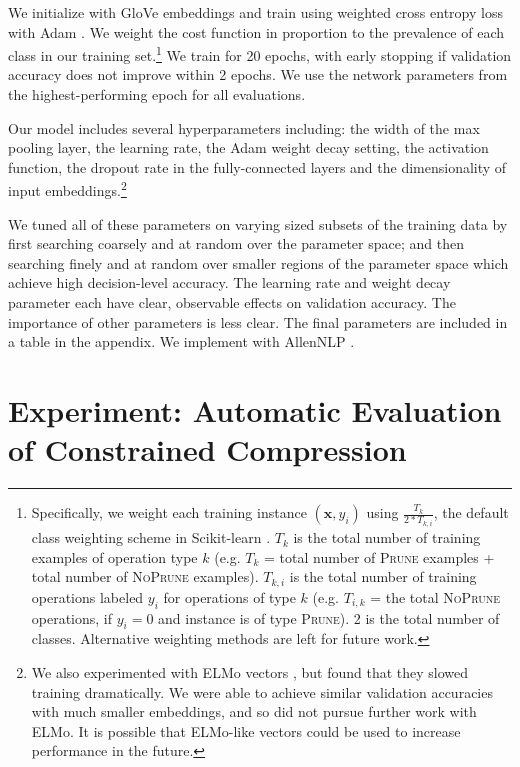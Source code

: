 \documentclass[11pt,a4paper]{article}
\begin{document}
We initialize with GloVe embeddings \cite{pennington2014glove} and train using weighted cross entropy loss with Adam \cite{Kingma2014AdamAM}. We weight the cost function in proportion to the prevalence of each class in our training set.\footnote{Specifically, we weight each training instance $(\bm{x}, y_i)$ using $\frac{T_k}{2 * T_{k,i}}$, the default class weighting scheme in Scikit-learn \cite{Pedregosa:2011:SML:1953048.2078195}. $T_k$ is the total number of training examples of operation type $k$ (e.g. $T_k$ = total number of \textsc{Prune} examples + total number of \textsc{NoPrune} examples). $T_{k,i}$ is the total number of training operations labeled $y_i$ for operations of type $k$ (e.g. $T_{i,k}$ = the total \textsc{NoPrune} operations, if $y_i=0$ and instance is of type \textsc{Prune}). 2 is the total number of classes. Alternative weighting methods are left for future work.} We train for 20 epochs, with early stopping if validation accuracy does not improve within 2 epochs. We use the network parameters from the highest-performing epoch for all evaluations.

Our model includes several hyperparameters including: the width of the max pooling layer, the learning rate, the Adam weight decay setting, the activation function, the dropout rate in the fully-connected layers and the dimensionality of input embeddings.\footnote{We also experimented with ELMo vectors \cite{Peters:2018}, but found that they slowed training dramatically. We were able to achieve similar validation accuracies with much smaller embeddings, and so did not pursue further work with ELMo. It is possible that ELMo-like vectors could be used to increase performance in the future.} 

We tuned all of these parameters on varying sized subsets of the training data by first searching coarsely and at random \cite{Bergstra2012RandomSF} over the parameter space; and then searching finely and at random over smaller regions of the parameter space which achieve high decision-level accuracy. The learning rate and weight decay parameter each have clear, observable effects on validation accuracy. 
The importance of other parameters is less clear. The final parameters are included in a table in the appendix. We implement with AllenNLP \cite{Gardner2017AllenNLP}.

\section{Experiment: Automatic Evaluation of Constrained Compression}\label{s:autoeval}
\end{document}
